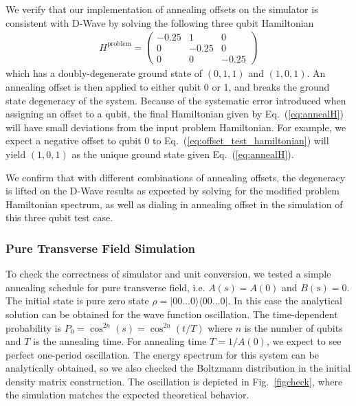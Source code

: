 \documentclass[prd,twocolumn,tightenlines,preprintnumbers,showpacs,superscriptaddress,notitlepage,nofootinbib,eqsecnum,floatfix,longbibliography,aps,10pt]{revtex4-2}
\begin{document}
We verify that our implementation of annealing offsets on the simulator is consistent with D-Wave by solving the following three qubit Hamiltonian
\begin{align}
	\label{eq:offset_test_hamiltonian}
	H^{\textrm{problem}} =
	\begin{pmatrix}
		-0.25 & 1 & 0 \\
		0 & -0.25 & 0 \\
		0 & 0 & -0.25
	\end{pmatrix}
\end{align}
which has a doubly-degenerate ground state of $(0, 1, 1)$ and $(1, 0, 1)$. An annealing offset is then applied to either qubit 0 or 1, and breaks the ground state degeneracy of the system. Because of the systematic error introduced when assigning an offset to a qubit, the final Hamiltonian given by Eq.~(\ref{eq:annealH}) will have small deviations from the input problem Hamiltonian. For example, we expect a negative offset to qubit 0 to Eq.~(\ref{eq:offset_test_hamiltonian}) will yield $(1, 0, 1)$ as the unique ground state given Eq.~(\ref{eq:annealH}).

We confirm that with different combinations of annealing offsets, the degeneracy is lifted on the D-Wave results as expected by solving for the modified problem Hamiltonian spectrum, as well as dialing in annealing offset in the simulation of this three qubit test case.


\subsubsection{Pure Transverse Field Simulation}
\label{sec:methods:simulation_details}
To check the correctness of simulator and unit conversion, we tested a simple annealing schedule for pure transverse field, i.e. $A(s)=A(0)$ and $B(s)=0$.
The initial state is pure zero state $\rho=|00...0\rangle \langle 00...0|$.
In this case the analytical solution can be obtained for the wave function oscillation.
The time-dependent probability is $P_{0}=\cos^{2n}(s)=\cos^{2n}(t/T)$ where $n$ is the number of qubits and $T$ is the annealing time.
For annealing time $T=1/A(0)$, we expect to see perfect one-period oscillation. The energy spectrum for this system can be analytically obtained, so we also checked the Boltzmann distribution in the initial density matrix construction. The oscillation is depicted in Fig.~\ref{figcheck}, where the simulation matches the expected theoretical behavior.
\end{document}
